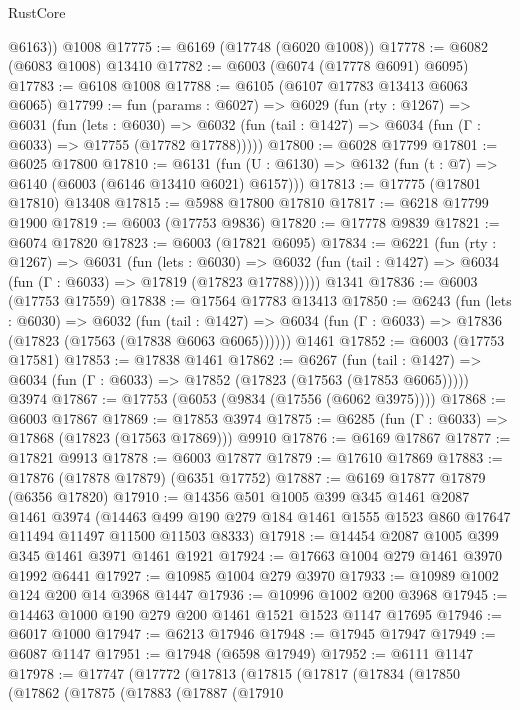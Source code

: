 \begin{lexlean}{RustCore}
\begin{coremodule}
        @6163))
    @1008
@17775 := @6169 (@17748 (@6020 @1008))
@17778 := @6082 (@6083 @1008) @13410
@17782 := @6003 (@6074 (@17778 @6091) @6095)
@17783 := @6108 @1008
@17788 := @6105 (@6107 @17783 @13413 @6063 @6065)
@17799 := fun (params : @6027) =>
  @6029
    (fun (rty : @1267) =>
    @6031
      (fun (lets : @6030) =>
      @6032 (fun (tail : @1427) => @6034 (fun (Γ : @6033) => @17755 (@17782 @17788)))))
@17800 := @6028 @17799
@17801 := @6025 @17800
@17810 := @6131
    (fun (U : @6130) => @6132 (fun (t : @7) => @6140 (@6003 (@6146 @13410 @6021) @6157)))
@17813 := @17775 (@17801 @17810) @13408
@17815 := @5988 @17800 @17810
@17817 := @6218 @17799 @1900
@17819 := @6003 (@17753 @9836)
@17820 := @17778 @9839
@17821 := @6074 @17820
@17823 := @6003 (@17821 @6095)
@17834 := @6221
    (fun (rty : @1267) =>
    @6031
      (fun (lets : @6030) =>
      @6032 (fun (tail : @1427) => @6034 (fun (Γ : @6033) => @17819 (@17823 @17788)))))
    @1341
@17836 := @6003 (@17753 @17559)
@17838 := @17564 @17783 @13413
@17850 := @6243
    (fun (lets : @6030) =>
    @6032
      (fun (tail : @1427) =>
      @6034 (fun (Γ : @6033) => @17836 (@17823 (@17563 (@17838 @6063 @6065))))))
    @1461
@17852 := @6003 (@17753 @17581)
@17853 := @17838 @1461
@17862 := @6267
    (fun (tail : @1427) => @6034 (fun (Γ : @6033) => @17852 (@17823 (@17563 (@17853 @6065)))))
    @3974
@17867 := @17753 (@6053 (@9834 (@17556 (@6062 @3975))))
@17868 := @6003 @17867
@17869 := @17853 @3974
@17875 := @6285 (fun (Γ : @6033) => @17868 (@17823 (@17563 @17869))) @9910
@17876 := @6169 @17867
@17877 := @17821 @9913
@17878 := @6003 @17877
@17879 := @17610 @17869
@17883 := @17876 (@17878 @17879) (@6351 @17752)
@17887 := @6169 @17877 @17879 (@6356 @17820)
@17910 := @14356
    @501
    @1005
    @399
    @345
    @1461
    @2087
    @1461
    @3974
    (@14463 @499 @190 @279 @184 @1461 @1555 @1523 @860 @17647 @11494 @11497 @11500 @11503 @8333)
@17918 := @14454 @2087 @1005 @399 @345 @1461 @3971 @1461 @1921
@17924 := @17663 @1004 @279 @1461 @3970 @1992 @6441
@17927 := @10985 @1004 @279 @3970
@17933 := @10989 @1002 @124 @200 @14 @3968 @1447
@17936 := @10996 @1002 @200 @3968
@17945 := @14463 @1000 @190 @279 @200 @1461 @1521 @1523 @1147 @17695
@17946 := @6017 @1000
@17947 := @6213 @17946
@17948 := @17945 @17947
@17949 := @6087 @1147
@17951 := @17948 (@6598 @17949)
@17952 := @6111 @1147
@17978 := @17747
    (@17772
      (@17813
        (@17815
          (@17817
            (@17834
              (@17850
                (@17862
                  (@17875
                    (@17883
                      (@17887
                        (@17910

\end{coremodule}
\end{lexlean}
